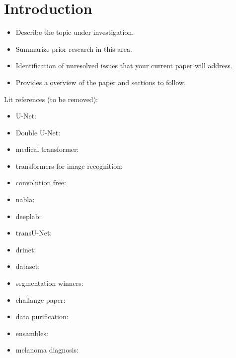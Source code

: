 \section{Introduction}

\begin{itemize}
  \item Describe the topic under investigation.
  \item Summarize prior research in this area.
  \item Identification of unresolved issues that your current paper will address.
  \item Provides a overview of the paper and sections to follow.
\end{itemize}


Lit references (to be removed):
\begin{itemize}
  \item U-Net: \citep{unet-2015-ronneberger}
  \item Double U-Net: \citep{double_unet-2020-jha}
  \item medical transformer: \citep{medical_transformer-2021-valanarasu}
  \item transformers for image recognition: \citep{transformers-2020-dosovitskiy}
  \item convolution free: \citep{convolution_free-2021-karimi}
  \item nabla: \citep{nabla-2019-alom}
  \item deeplab: \citep{deeplab-2016-chen}
  \item transU-Net: \citep{transunet-2021-chen}
  \item drinet: \citep{drinet-2018-chen}
  \item dataset: \citep{isic-2018-segmentation}
  \item segmentation winners: \citep{skin_segmentation-2019-jahanifar}
  \item challange paper: \citep{challenge-2018-codella}
  \item data purification: \citep{data_purification-2019-bisla}
  \item ensambles: \citep{ensambles-2016-codella}
  \item melanoma diagnosis: \citep{melonama_diagnosis-2021-codella}
\end{itemize}

